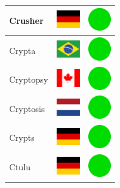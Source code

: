 \documentclass[12pt, a4paper, twoside]{report}
\begin{document}
\begin{center}
\begin{longtable}{|p{5cm}|p{2cm}|p{2cm}|}
Crusher & \includegraphics[width=1cm]{4x3/de} & \includegraphics[width=1cm]{likes/y} \\ \hline
Crypta & \includegraphics[width=1cm]{4x3/br} & \includegraphics[width=1cm]{likes/y} \\ \hline
Cryptopsy & \includegraphics[width=1cm]{4x3/ca} & \includegraphics[width=1cm]{likes/y} \\ \hline
Cryptosis & \includegraphics[width=1cm]{4x3/nl} & \includegraphics[width=1cm]{likes/y} \\ \hline
Crypts & \includegraphics[width=1cm]{4x3/de} & \includegraphics[width=1cm]{likes/y} \\ \hline
Ctulu & \includegraphics[width=1cm]{4x3/de} & \includegraphics[width=1cm]{likes/y} \\ \hline

\end{longtable}
\end{center}
\end{document}
